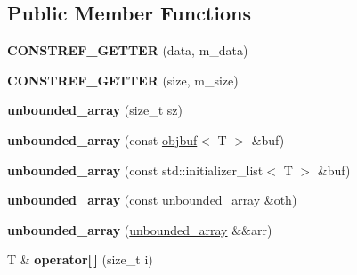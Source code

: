 \subsection*{Public Member Functions}
\begin{DoxyCompactItemize}
\item 
{\bfseries C\+O\+N\+S\+T\+R\+E\+F\+\_\+\+G\+E\+T\+T\+ER} (data, m\+\_\+data)\hypertarget{classgxx_1_1unbounded__array_a4b561445009bd5111c9111ce03967a0a}{}\label{classgxx_1_1unbounded__array_a4b561445009bd5111c9111ce03967a0a}

\item 
{\bfseries C\+O\+N\+S\+T\+R\+E\+F\+\_\+\+G\+E\+T\+T\+ER} (size, m\+\_\+size)\hypertarget{classgxx_1_1unbounded__array_a359cd5af883e55877472bd0f71d26c72}{}\label{classgxx_1_1unbounded__array_a359cd5af883e55877472bd0f71d26c72}

\item 
{\bfseries unbounded\+\_\+array} (size\+\_\+t sz)\hypertarget{classgxx_1_1unbounded__array_aaa0a828443c634dedad5b7a4c83dcef2}{}\label{classgxx_1_1unbounded__array_aaa0a828443c634dedad5b7a4c83dcef2}

\item 
{\bfseries unbounded\+\_\+array} (const \hyperlink{classgxx_1_1object__buffer}{objbuf}$<$ T $>$ \&buf)\hypertarget{classgxx_1_1unbounded__array_af8ebdde828bb19377a2f50c2241c4195}{}\label{classgxx_1_1unbounded__array_af8ebdde828bb19377a2f50c2241c4195}

\item 
{\bfseries unbounded\+\_\+array} (const std\+::initializer\+\_\+list$<$ T $>$ \&buf)\hypertarget{classgxx_1_1unbounded__array_ab94b48cae419b9224a1ff0b26b703eb8}{}\label{classgxx_1_1unbounded__array_ab94b48cae419b9224a1ff0b26b703eb8}

\item 
{\bfseries unbounded\+\_\+array} (const \hyperlink{classgxx_1_1unbounded__array}{unbounded\+\_\+array} \&oth)\hypertarget{classgxx_1_1unbounded__array_a366510a95570997029edc38783edcda1}{}\label{classgxx_1_1unbounded__array_a366510a95570997029edc38783edcda1}

\item 
{\bfseries unbounded\+\_\+array} (\hyperlink{classgxx_1_1unbounded__array}{unbounded\+\_\+array} \&\&arr)\hypertarget{classgxx_1_1unbounded__array_a5c72bcb6c6db26a58c59b54453615605}{}\label{classgxx_1_1unbounded__array_a5c72bcb6c6db26a58c59b54453615605}

\item 
T \& {\bfseries operator\mbox{[}$\,$\mbox{]}} (size\+\_\+t i)\hypertarget{classgxx_1_1unbounded__array_a6a719ba78e387d6e3884790277618894}{}\label{classgxx_1_1unbounded__array_a6a719ba78e387d6e3884790277618894}


\end{DoxyCompactItemize}
